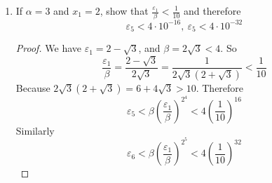 \documentclass[hidelinks,12pt]{article}
\newcommand{\N}{\mathbb{N}}
\begin{document}
\begin{enumerate}
\begin{enumerate}[label=(\alph*).]
\begin{proof}
\[            2x_{n}\varepsilon_{n+1}=x^{2}_{n}-2x_{n}\sqrt{\alpha}+\alpha=\varepsilon_{n}^{2}
            \]
            So \(\varepsilon_{n+1}=\frac{\varepsilon_{n}^{2}}{2x_{n}}\). By above, we always have \(x_{n}>\sqrt{\alpha}\), so the denominator is bigger, and therefore \[
                \varepsilon_{n+1}=\frac{\varepsilon_{n}^{2}}{2x_{n}}<\frac{\varepsilon_{n}^{2}}{2\sqrt{\alpha}}
            \]
           Then, we must show for all \(n\) that,
           \[
        \varepsilon_{n+1}<\beta\left(\frac{\varepsilon_{1}}{\beta}\right)^{2^{n}}
       \]
       Let \(n=1\), we have
       \[
           \varepsilon_{2}<\frac{\varepsilon_{1}^{2}}{\beta}=\beta\left(\frac{\varepsilon_{1}}{\beta}\right)^{2}
       \]
       Assume for some \(k\in\N\),\[
        \varepsilon_{k+1}<\beta\left(\frac{\varepsilon_{1}}{\beta}\right)^{2^{k}}
       \]
       Then, \[
           \varepsilon_{k+2}<\beta\left(\frac{\varepsilon_{k+1}}{\beta}\right)^{2}<\beta\left[\frac{\beta\left(\frac{\varepsilon_{1}}{\beta}\right)^{2^{k}}}{\beta}\right]^{2}=\beta\left(\frac{\varepsilon_{1}}{\beta}\right)^{2^{k+1}}
       \]
       As required. 
           \end{proof}
       \item If \(\alpha=3\) and \(x_{1}=2\), show that \(\frac{\varepsilon_{1}}{\beta}<\frac{1}{10}\) and therefore \[
        \varepsilon_{5}<4\cdot10^{-16},\ \varepsilon_{5}<4\cdot10^{-32}
        \]
        \begin{proof}
            We have \(\varepsilon_{1}=2-\sqrt{3}\), and \(\beta=2\sqrt{3}<4\). So \[
                \frac{\varepsilon_{1}}{\beta}=\frac{2-\sqrt{3}}{2\sqrt{3}}=\frac{1}{2\sqrt{3}(2+\sqrt{3})}<\frac{1}{10}
            \]
            Because \(2\sqrt{3}(2+\sqrt{3})=6+4\sqrt{3}>10\). Therefore\[
                \varepsilon_{5}<\beta\left(\frac{\varepsilon_{1}}{\beta}\right)^{2^{4}}<4\left(\frac{1}{10}\right)^{16}\tag{By above}
            \]
           Similarly \[
               \varepsilon_{6}<\beta\left(\frac{\varepsilon_{1}}{\beta}\right)^{2^{5}}<4\left(\frac{1}{10}\right)^{32}
           \]
        \end{proof}
    \end{enumerate}
\end{enumerate}
\end{document}
